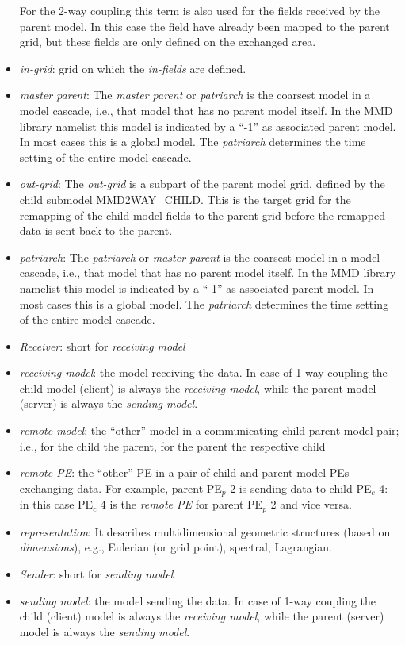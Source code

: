 \documentclass[twoside]{article}
\begin{document}
\begin{appendix}
\begin{itemize}
  For the 2-way coupling this term is also used for the fields
  received by the parent model. In this case the field have already
  been mapped to the parent grid, but these fields are only
  defined on the exchanged area.
\item {\it in-grid}: grid on which the {\it in-fields} are defined.
\item {\it master parent}: The {\it master parent} or {\it patriarch}
  is the coarsest model in a  model cascade, i.e., that model that has
  no parent model itself. In the MMD library 
namelist this model is indicated by a ``-1'' as associated parent model.
 In most cases this is a global model.  The {\it patriarch}
determines the time setting of the entire model cascade. 
\item {\it out-grid}: The {\it out-grid} is a subpart of the parent model
  grid, defined by the child submodel MMD2WAY\_CHILD. This is the
  target grid for the remapping of the child model fields to the parent 
  grid before the remapped data is sent back to the parent. 
\item {\it patriarch}: The {\it patriarch} or {\it master parent} 
  is the coarsest model in a  model cascade, i.e., that model that has
  no parent model itself. In the MMD library 
namelist this model is indicated by a ``-1'' as associated parent model.
 In most cases this is a global model.  The {\it patriarch}
determines the time setting of the entire model cascade. 
\item {\it Receiver}: short for {\it receiving model}
\item {\it receiving model}: the model receiving the data. In case of
1-way coupling the child model (client) is always the {\it receiving
model}, while the parent model (server) is always the {\it sending model}.

\item {\it remote model}: the ``other'' model in a communicating
child-parent model 
pair; i.e., for the child the parent, for the parent the respective child
\item {\it remote PE}: the ``other'' PE in a pair of child and parent
model PEs exchanging data. For example, parent PE$_p$ 2 is sending
data to child PE$_c$ 4: 
in this case PE$_c$ 4 is the {\it remote PE} for parent PE$_p$ 2 and
vice versa. 
\item {\it representation}: It describes multidimensional geometric
structures (based on {\it dimensions}), e.g., Eulerian (or grid point),
spectral, Lagrangian.
\item {\it Sender}: short for {\it sending model}
\item {\it sending model}: the model sending the data. In case of
1-way coupling the child (client) model is always the {\it receiving
model}, while the parent (server) model is always the {\it sending model}.

\end{itemize}

\end{appendix}

\end{document}
